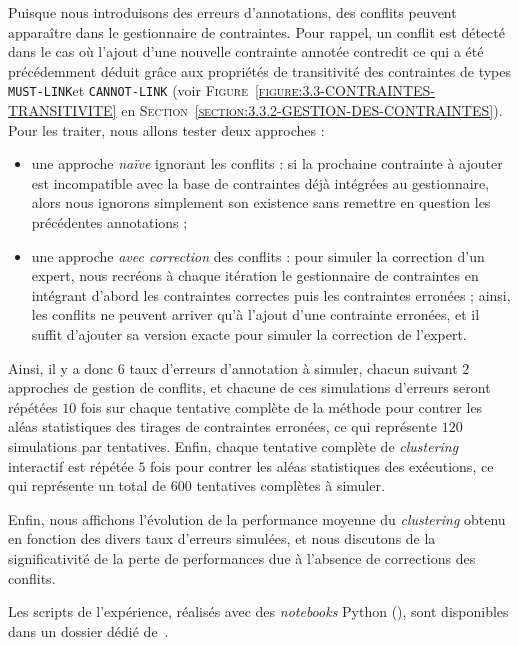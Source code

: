 			Puisque nous introduisons des erreurs d'annotations, des conflits peuvent apparaître dans le gestionnaire de contraintes.
			Pour rappel, un conflit est détecté dans le cas où l'ajout d'une nouvelle contrainte annotée contredit ce qui a été précédemment déduit grâce aux propriétés de transitivité des contraintes de types \texttt{MUST-LINK}et \texttt{CANNOT-LINK} (voir \textsc{Figure~\ref{figure:3.3-CONTRAINTES-TRANSITIVITE}} en \textsc{Section~\ref{section:3.3.2-GESTION-DES-CONTRAINTES}}).
			Pour les traiter, nous allons tester deux approches :
			\begin{itemize}
				\item une approche \textit{naïve} ignorant les conflits : si la prochaine contrainte à ajouter est incompatible avec la base de contraintes déjà intégrées au gestionnaire, alors nous ignorons simplement son existence sans remettre en question les précédentes annotations ;
				\item une approche \textit{avec correction} des conflits : pour simuler la correction d'un expert, nous recréons à chaque itération le gestionnaire de contraintes en intégrant d'abord les contraintes correctes puis les contraintes erronées ; ainsi, les conflits ne peuvent arriver qu'à l'ajout d'une contrainte erronées, et il suffit d'ajouter sa version exacte pour simuler la correction de l'expert.
			\end{itemize}
			
			Ainsi, il y a donc $6$ taux d'erreurs d'annotation à simuler, chacun suivant $2$ approches de gestion de conflits, et chacune de ces simulations d'erreurs seront répétées $10$ fois sur chaque tentative complète de la méthode pour contrer les aléas statistiques des tirages de contraintes erronées, ce qui représente $120$ simulations par tentatives.
			Enfin, chaque tentative complète de \textit{clustering} interactif est répétée $5$ fois pour contrer les aléas statistiques des exécutions, ce qui représente un total de $600$ tentatives complètes à simuler.

			Enfin, nous affichons l'évolution de la performance moyenne du \textit{clustering} obtenu en fonction des divers taux d'erreurs simulées, et nous discutons de la significativité de la perte de performances due à l'absence de corrections des conflits.
			
			\begin{leftBarInformation}
				Les scripts de l'expérience, réalisés avec des \textit{notebooks} Python (\cite{van-rossum-drake:2009:python-reference-manual}), sont disponibles dans un dossier dédié de~\cite{schild:2021:cognitivefactory-interactiveclusteringcomparativestudy}.
			\end{leftBarInformation}

